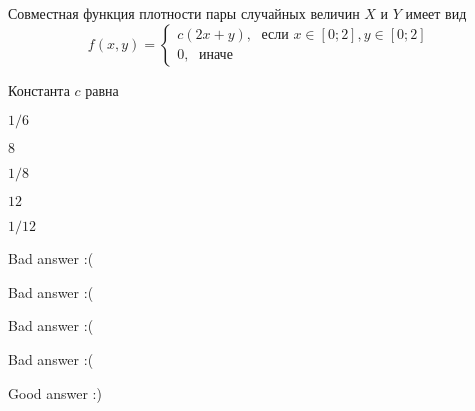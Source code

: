 
\begin{question}
Совместная функция плотности пары случайных величин \(X\) и \(Y\) имеет
вид \[
f(x,y)=\begin{cases}
c (2x+y), \; \text{ если } x\in[0;2], y\in [0;2] \\
0, \; \text{ иначе}
\end{cases}
\]

Константа \(c\) равна
\begin{answerlist}
  \item \(1/6\)
  \item \(8\)
  \item \(1/8\)
  \item \(12\)
  \item \(1/12\)
\end{answerlist}
\end{question}

\begin{solution}
\begin{answerlist}
  \item Bad answer :(
  \item Bad answer :(
  \item Bad answer :(
  \item Bad answer :(
  \item Good answer :)
\end{answerlist}
\end{solution}

